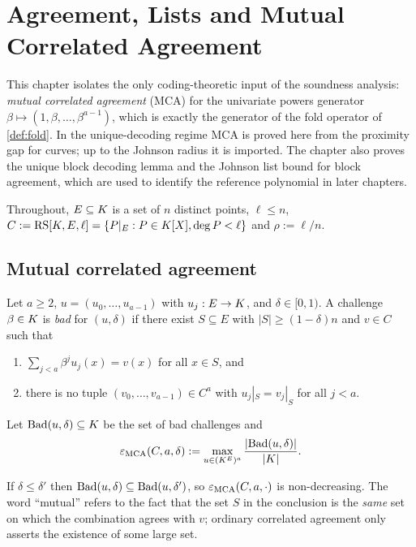 \chapter{Agreement, Lists and Mutual Correlated Agreement}
\label{ch:mca}

This chapter isolates the only coding-theoretic input of the soundness analysis:
\emph{mutual correlated agreement} (MCA) for the univariate powers generator
$\beta\mapsto(1,\beta,\dots,\beta^{a-1})$, which is exactly the generator of the fold
operator of \cref{def:fold}. In the unique-decoding regime MCA is proved here from the
proximity gap for curves; up to the Johnson radius it is imported. The chapter also
proves the unique block decoding lemma and the Johnson list bound for block agreement,
which are used to identify the reference polynomial in later chapters.

Throughout, $E\subseteq K$ is a set of $n$ distinct points, $\ell\le n$,
$C:=\mathrm{RS}[K,E,\ell]=\{P|_E:P\in K[X],\deg P<\ell\}$ and $\rho:=\ell/n$.

\section{Mutual correlated agreement}

\begin{definition}\label{def:mca}
Let $a\ge2$, $u=(u_0,\dots,u_{a-1})$ with $u_j:E\to K$, and $\delta\in[0,1)$. A challenge
$\beta\in K$ is \emph{bad} for $(u,\delta)$ if there exist $S\subseteq E$ with
$|S|\ge(1-\delta)n$ and $v\in C$ such that
\begin{enumerate}[label=\textup{(\roman*)}]
\item $\sum_{j<a}\beta^ju_j(x)=v(x)$ for all $x\in S$, and
\item there is no tuple $(v_0,\dots,v_{a-1})\in C^a$ with $u_j|_S=v_j|_S$ for all $j<a$.
\end{enumerate}
Let $\mathrm{Bad}(u,\delta)\subseteq K$ be the set of bad challenges and
\[
\varepsilon_{\mathrm{MCA}}(C,a,\delta):=\max_{u\in(K^E)^a}\frac{|\mathrm{Bad}(u,\delta)|}{|K|}.
\]
\end{definition}

\begin{remark}\label{rem:mca-monotone}
If $\delta\le\delta'$ then $\mathrm{Bad}(u,\delta)\subseteq\mathrm{Bad}(u,\delta')$, so
$\varepsilon_{\mathrm{MCA}}(C,a,\cdot)$ is non-decreasing. The word ``mutual'' refers to the fact that
the set $S$ in the conclusion is the \emph{same} set on which the combination agrees with
$v$; ordinary correlated agreement only asserts the existence of some large set.
\end{remark}


